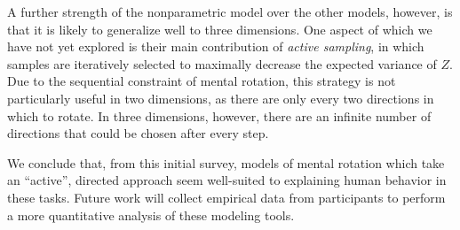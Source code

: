 \documentclass{article} %
\newcommand{\TODO}[1]{\textcolor{red}{[TODO: #1]}}
\begin{document}
A further strength of the nonparametric model over the other models,
however, is that it is likely to generalize well to three
dimensions. One aspect of \cite{Osborne:2012tm} which we have not yet
explored is their main contribution of \textit{active sampling}, in
which samples are iteratively selected to maximally decrease the
expected variance of $Z$. Due to the sequential constraint of mental
rotation, this strategy is not particularly useful in two dimensions,
as there are only every two directions in which to rotate. In three
dimensions, however, there are an infinite number of directions that
could be chosen after every step.

We conclude that, from this initial survey, models of mental rotation
which take an ``active'', directed approach seem well-suited to
explaining human behavior in these tasks. Future work will collect
empirical data from participants to perform a more quantitative
analysis of these modeling tools.



\renewcommand\refname{\normalsize{References}}


\end{document}
